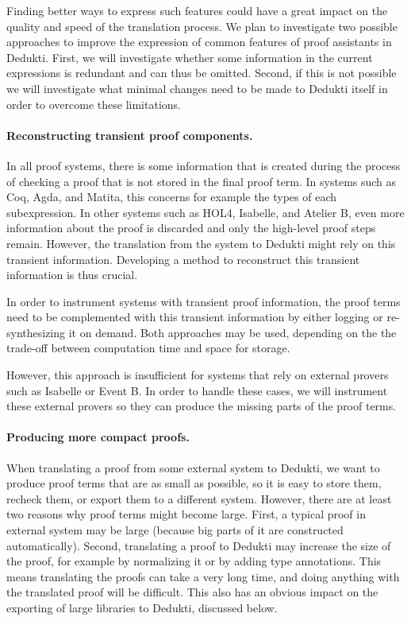 Finding better ways to express such features could have a great impact
on the quality and speed of the translation process.  We plan to
investigate two possible approaches to improve the expression of
common features of proof assistants in Dedukti. First, we will
investigate whether some information in the current expressions is
redundant and can thus be omitted. Second, if this is not possible we
will investigate what minimal changes need to be made to Dedukti
itself in order to overcome these limitations.

\paragraph*{Reconstructing transient proof components.}
In all proof systems, there is some information that is created during
the process of checking a proof that is not stored in the final proof
term. In systems such as Coq, Agda, and Matita, this concerns for
example the types of each subexpression. In other systems such as
HOL4, Isabelle, and Atelier B, even more information about the proof
is discarded and only the high-level proof steps remain.  However, the
translation from the system to Dedukti might rely on this transient
information. Developing a method to reconstruct this transient
information is thus crucial.

In order to instrument systems with transient proof information, the
proof terms need to be complemented with this transient information by
either logging or re-synthesizing it on demand. Both approaches may be
used, depending on the the trade-off between computation time and space
for storage.

However, this approach is insufficient for systems that rely on
external provers such as Isabelle or Event B. In order to handle these
cases, we will instrument these external provers so they can produce
the missing parts of the proof terms.

\paragraph*{Producing more compact proofs.}
When translating a proof from some external system to Dedukti, we want
to produce proof terms that are as small as possible, so it is easy to
store them, recheck them, or export them to a different
system. However, there are at least two reasons why proof terms might
become large. First, a typical proof in external system may be large
(because big parts of it are constructed automatically). Second,
translating a proof to Dedukti may increase the size of the proof, for
example by normalizing it or by adding type annotations.  This means
translating the proofs can take a very long time, and doing anything
with the translated proof will be difficult. This also has an obvious
impact on the exporting of large libraries to Dedukti, discussed
below.

